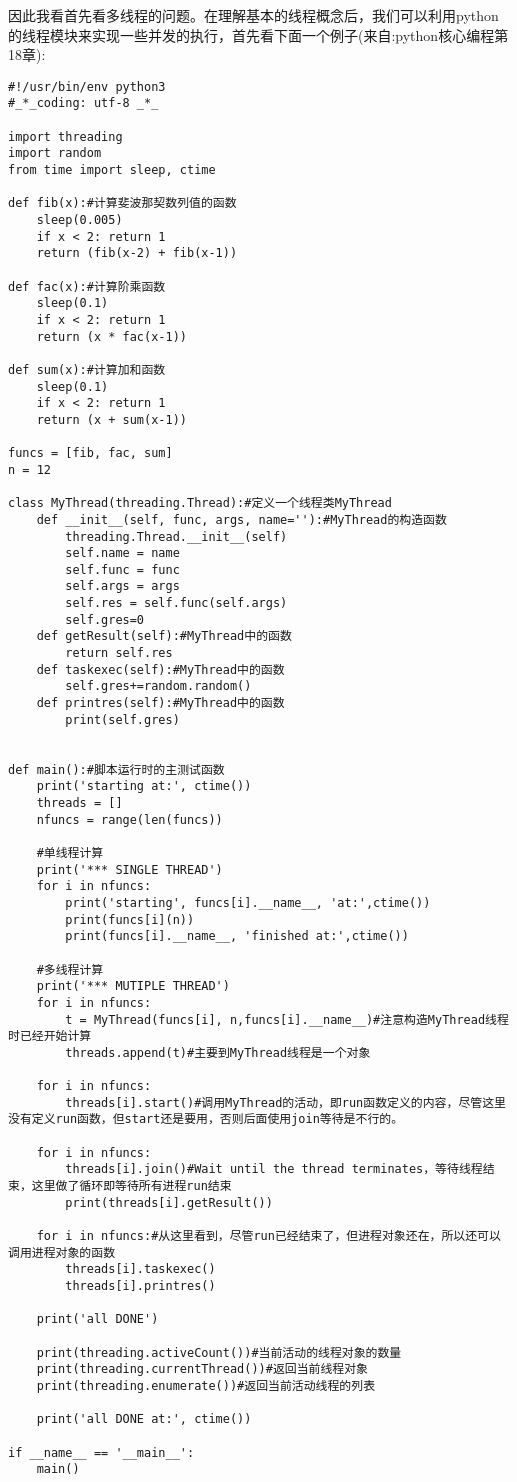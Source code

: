 \documentclass[twoside,11pt]{book}
\begin{document}
因此我看首先看多线程的问题。在理解基本的线程概念后，我们可以利用python的线程模块来实现一些并发的执行，首先看下面一个例子(来自:python核心编程第18章):
\begin{lstlisting}
#!/usr/bin/env python3
#_*_coding: utf-8 _*_

import threading
import random
from time import sleep, ctime

def fib(x):#计算斐波那契数列值的函数
    sleep(0.005)
    if x < 2: return 1
    return (fib(x-2) + fib(x-1))

def fac(x):#计算阶乘函数
    sleep(0.1)
    if x < 2: return 1
    return (x * fac(x-1))

def sum(x):#计算加和函数
    sleep(0.1)
    if x < 2: return 1
    return (x + sum(x-1))

funcs = [fib, fac, sum]
n = 12

class MyThread(threading.Thread):#定义一个线程类MyThread
    def __init__(self, func, args, name=''):#MyThread的构造函数
        threading.Thread.__init__(self)
        self.name = name
        self.func = func
        self.args = args
        self.res = self.func(self.args)
        self.gres=0
    def getResult(self):#MyThread中的函数
        return self.res
    def taskexec(self):#MyThread中的函数
        self.gres+=random.random()
    def printres(self):#MyThread中的函数
        print(self.gres)


def main():#脚本运行时的主测试函数
    print('starting at:', ctime())
    threads = []
    nfuncs = range(len(funcs))

    #单线程计算
    print('*** SINGLE THREAD')
    for i in nfuncs:
        print('starting', funcs[i].__name__, 'at:',ctime())
        print(funcs[i](n))
        print(funcs[i].__name__, 'finished at:',ctime())

    #多线程计算
    print('*** MUTIPLE THREAD')
    for i in nfuncs:
        t = MyThread(funcs[i], n,funcs[i].__name__)#注意构造MyThread线程时已经开始计算
        threads.append(t)#主要到MyThread线程是一个对象

    for i in nfuncs:
        threads[i].start()#调用MyThread的活动，即run函数定义的内容，尽管这里没有定义run函数，但start还是要用，否则后面使用join等待是不行的。

    for i in nfuncs:
        threads[i].join()#Wait until the thread terminates，等待线程结束，这里做了循环即等待所有进程run结束
        print(threads[i].getResult())

    for i in nfuncs:#从这里看到，尽管run已经结束了，但进程对象还在，所以还可以调用进程对象的函数
        threads[i].taskexec()
        threads[i].printres()

    print('all DONE')

    print(threading.activeCount())#当前活动的线程对象的数量
    print(threading.currentThread())#返回当前线程对象
    print(threading.enumerate())#返回当前活动线程的列表

    print('all DONE at:', ctime())

if __name__ == '__main__':
    main()
\end{lstlisting}
\end{document}

